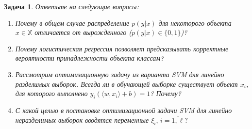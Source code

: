 \documentclass[12pt,fleqn]{article}
\newtheorem{esProblem}{Задача}
\begin{document}
\begin{esProblem}
    Ответьте на следующие вопросы:
    \begin{enumerate}
    \item Почему в общем случае распределение $p(y|x)$ для некоторого объекта $x \in \mathbb{X}$ отличается от вырожденного ($p(y|x) \in \{0,1\}$)?
    \item Почему логистическая регрессия позволяет предсказывать корректные вероятности принадлежности объекта классам?
    \item Рассмотрим оптимизационную задачу из варианта SVM для линейно разделимых выборок. Всегда ли в обучающей выборке существует объект $x_i$, для которого выполнено $y_i (\langle w, x_i \rangle + b) = 1$? Почему?
    \item С какой целью в постановке оптимизационной задачи SVM для линейно неразделимых выборок вводятся переменные $\xi_i, \, i = \overline{1, \ell}?$
    \end{enumerate}
\end{esProblem}
\end{document}
